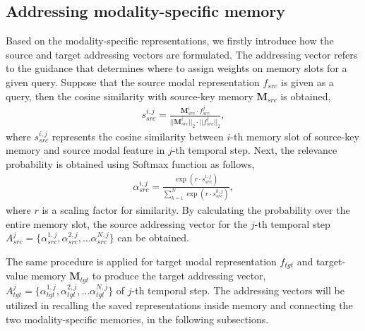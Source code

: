 \documentclass[10pt,twocolumn,letterpaper]{article}
\begin{document}
\subsection{Addressing modality-specific memory}
Based on the modality-specific representations, we firstly introduce how the source and target addressing vectors are formulated. The addressing vector refers to the guidance that determines where to assign weights on memory slots for a given query. Suppose that the source modal representation $f_{src}$ is given as a query, then the cosine similarity with source-key memory $\mathbf{M}_{src}$ is obtained,
\begin{align}
\label{eq:1}
    s^{i,j}_{src}=\frac{\textbf{M}_{src}^i \cdot f^j_{src} }{||\textbf{M}_{src}^i||_2 \cdot ||f^j_{src}||_2 },
\end{align}
where $s_{src}^{i,j}$ represents the cosine similarity between $i$-th memory slot of source-key memory and source modal feature in $j$-th temporal step.
Next, the relevance probability is obtained using Softmax function as follows,
\begin{align}
\label{eq:2}
    \alpha^{i,j}_{src}=\frac{\exp{(r \cdot s^{i,j}_{src})}}{\sum_{k=1}^N{\exp{(r \cdot s^{k,j}_{src})}}},
\end{align}
where $r$ is a scaling factor for similarity. By calculating the probability over the entire memory slot, the source addressing vector for the $j$-th temporal step $A^j_{src}=\{\alpha^{1,j}_{src},\alpha^{2,j}_{src},\dots \alpha^{N,j}_{src}\}$ can be obtained.

The same procedure is applied for target modal representation $f_{tgt}$ and target-value memory $\mathbf{M}_{tgt}$ to produce the target addressing vector, $A^j_{tgt}=\{\alpha^{1,j}_{tgt},\alpha^{2,j}_{tgt},\dots \alpha^{N,j}_{tgt}\}$ of $j$-th temporal step. The addressing vectors will be utilized in recalling the saved representations inside memory and connecting the two modality-specific memories, in the following subsections.
\end{document}
